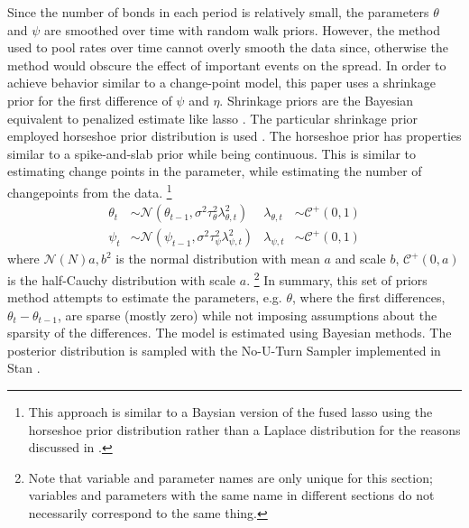\documentclass[11pt, oneside, article]{memoir}\usepackage[]{graphicx}\usepackage[]{color}
\newcommand{\dist}[1]{\mathcal{#1}}
\newcommand{\paren}[1]{\mathopen{}\left(#1\right)\mathclose{}}
\newcommand{\disti}[2]{\ensuremath{\dist{#1}\paren{#2}}}
\newcommand{\dnorm}[1]{\disti{N}{#1}}
\newcommand{\dhalfcauchy}[1]{\disti{C^+}{#1}}
\begin{document}
Since the number of bonds in each period is relatively small, the parameters $\theta$ and $\psi$ are smoothed over time with random walk priors.
However, the method used to pool rates over time cannot overly smooth the data since, otherwise the method would obscure the effect of important events on the spread.
In order to achieve behavior similar to a change-point model, this paper uses a shrinkage prior for the first difference of $\psi$ and $\eta$.
Shrinkage priors are the Bayesian equivalent to penalized estimate like lasso \parencites{Tibshirani1996}{ParkCasella2008}.
The particular shrinkage prior employed horseshoe prior distribution is used \parencites{CarvalhoPolsonScott2009}{CarvalhoPolsonScott2009}.
The horseshoe prior has properties similar to a spike-and-slab prior while being continuous.
This is similar to estimating change points in the parameter, while estimating the number of changepoints from the data.
\footnote{This approach is similar to a Baysian version of the fused lasso \textcite{TibshiraniEtAl2005} using the horseshoe prior distribution rather than a Laplace distribution for the reasons discussed in \parencites{CarvalhoPolsonScott2009}{CarvalhoPolsonScott2009}.}
\begin{align}
  \theta_{t} & \sim \dnorm{\theta_{t-1}, \sigma^{2} \tau_{\theta}^{2} \lambda_{\theta,t}^{2}}
  & \lambda_{\theta,t} & \sim \dhalfcauchy{0, 1} \\
  \psi_{t} & \sim \dnorm{\psi_{t-1}, \sigma^{2} \tau_{\psi}^{2} \lambda_{\psi,t}^{2}}
  & \lambda_{\psi,t} & \sim \dhalfcauchy{0, 1}
\end{align}
where $\dnorm{N}{a, b^{2}}$ is the normal distribution with mean $a$ and scale $b$, $\dhalfcauchy{0, a}$ is the half-Cauchy distribution with scale $a$.%
\footnote{Note that variable and parameter names are only unique for this section; variables and parameters with the same name in different sections do not necessarily correspond to the same thing.}
In summary, this set of priors method attempts to estimate the parameters, e.g. $\theta$, where the first differences, $\theta_{t} - \theta_{t-1}$, are sparse (mostly zero) while not imposing assumptions about the sparsity of the differences.
The model is estimated using Bayesian methods.
The posterior distribution is sampled with the No-U-Turn Sampler implemented in Stan \parencites{Stan2014}{HoffmanGelman2013}.
\end{document}
